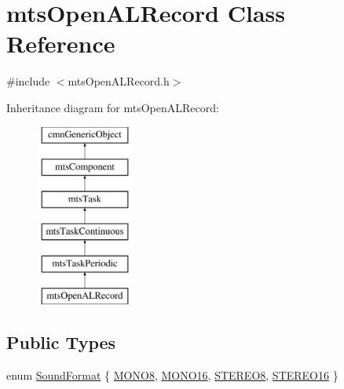 \hypertarget{classmts_open_a_l_record}{\section{mts\-Open\-A\-L\-Record Class Reference}
\label{classmts_open_a_l_record}
}


{\ttfamily \#include $<$mts\-Open\-A\-L\-Record.\-h$>$}

Inheritance diagram for mts\-Open\-A\-L\-Record\-:\begin{figure}[H]
\begin{center}
\leavevmode
\includegraphics[height=6.000000cm]{d6/d64/classmts_open_a_l_record}
\end{center}
\end{figure}
\subsection*{Public Types}
\begin{DoxyCompactItemize}
\item 
enum \hyperlink{classmts_open_a_l_record_a2d116a8b22a82a4255ae64c32e2c48a5}{Sound\-Format} \{ \hyperlink{classmts_open_a_l_record_a2d116a8b22a82a4255ae64c32e2c48a5a5ca88ef75354851153e15a2452873f48}{M\-O\-N\-O8}, 
\hyperlink{classmts_open_a_l_record_a2d116a8b22a82a4255ae64c32e2c48a5a01080a99fb43d5bf53f695a2844f6ca6}{M\-O\-N\-O16}, 
\hyperlink{classmts_open_a_l_record_a2d116a8b22a82a4255ae64c32e2c48a5ae7217bba22c6e7438dbf5a6351e03dfc}{S\-T\-E\-R\-E\-O8}, 
\hyperlink{classmts_open_a_l_record_a2d116a8b22a82a4255ae64c32e2c48a5a08fb0f867599715554390dcec9d8bf48}{S\-T\-E\-R\-E\-O16}
 \}
\end{DoxyCompactItemize}
